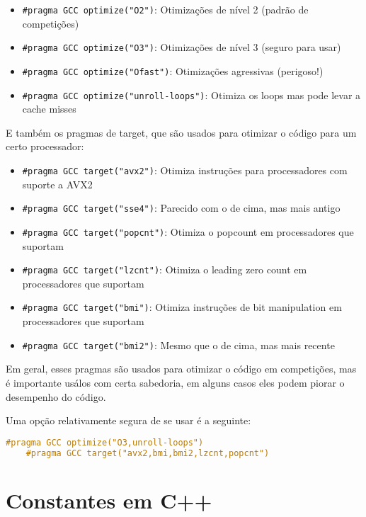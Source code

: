 \documentclass[10pt, a4paper, oneside]{book}
\begin{document}
\begin{itemize}
    \item \texttt{\#pragma GCC optimize("O2")}: Otimizações de nível 2 (padrão de competições)
    \item \texttt{\#pragma GCC optimize("O3")}: Otimizações de nível 3 (seguro para usar)
    \item \texttt{\#pragma GCC optimize("Ofast")}: Otimizações agressivas (perigoso!)
    \item \texttt{\#pragma GCC optimize("unroll-loops")}: Otimiza os loops mas pode levar a cache misses
\end{itemize}

E também os pragmas de target, que são usados para otimizar o código para um certo processador:

\begin{itemize}
    \item \texttt{\#pragma GCC target("avx2")}: Otimiza instruções para processadores com suporte a AVX2
    \item \texttt{\#pragma GCC target("sse4")}: Parecido com o de cima, mas mais antigo
    \item \texttt{\#pragma GCC target("popcnt")}: Otimiza o popcount em processadores que suportam
    \item \texttt{\#pragma GCC target("lzcnt")}: Otimiza o leading zero count em processadores que suportam
    \item \texttt{\#pragma GCC target("bmi")}: Otimiza instruções de bit manipulation em processadores que suportam
    \item \texttt{\#pragma GCC target("bmi2")}: Mesmo que o de cima, mas mais recente
\end{itemize}

Em geral, esses pragmas são usados para otimizar o código em competições, mas é importante usálos com certa sabedoria, em alguns casos eles podem piorar o desempenho do código.

Uma opção relativamente segura de se usar é a seguinte:

\begin{lstlisting}[language=C++]
    #pragma GCC optimize("O3,unroll-loops")
    #pragma GCC target("avx2,bmi,bmi2,lzcnt,popcnt")
\end{lstlisting}

\section{Constantes em C++}
\end{document}
